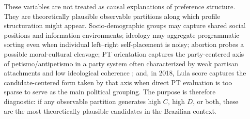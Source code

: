 \documentclass[12pt]{article}
\begin{document}
These variables are not treated as causal explanations of preference structure.
They are theoretically plausible observable partitions along which profile
structuration might appear. Socio-demographic groups may capture shared social
positions and information environments; ideology may aggregate programmatic
sorting even when individual left--right self-placement is noisy; abortion
probes a possible moral-cultural cleavage; PT orientation captures the
party-centered axis of petismo/antipetismo in a party system often characterized
by weak partisan attachments and low ideological coherence
\parencite{borba24_polar_ideol}; and, in 2018, Lula score captures the
candidate-centered form taken by that axis when direct PT evaluation is too
sparse to serve as the main political grouping. The purpose is therefore
diagnostic: if any observable partition generates high \(C\), high \(D\), or
both, these are the most theoretically plausible candidates in the Brazilian
context.









\end{document}
